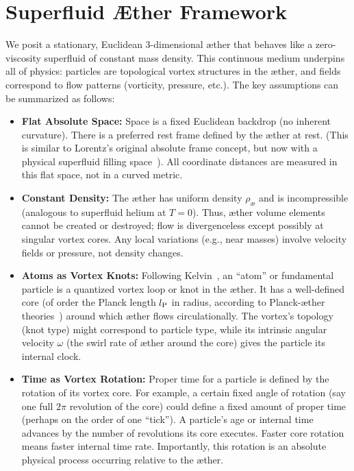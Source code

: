 
\section{Superfluid Æther Framework}

We posit a stationary, Euclidean 3-dimensional æther that behaves like a zero-viscosity superfluid of constant mass density. This continuous medium underpins all of physics: particles are topological vortex structures in the æther, and fields correspond to flow patterns (vorticity, pressure, etc.). The key assumptions can be summarized as follows:

\begin{itemize}
    \item \textbf{Flat Absolute Space:} Space is a fixed Euclidean backdrop (no inherent curvature). There is a preferred rest frame defined by the æther at rest. (This is similar to Lorentz’s original absolute frame concept, but now with a physical superfluid filling space~\cite{Winterberg2002-PlanckAether}). All coordinate distances are measured in this flat space, not in a curved metric.

    \item \textbf{Constant Density:} The æther has uniform density $\rho_{\text{\ae}}$ and is incompressible (analogous to superfluid helium at $T=0$). Thus, æther volume elements cannot be created or destroyed; flow is divergenceless except possibly at singular vortex cores. Any local variations (e.g., near masses) involve velocity fields or pressure, not density changes.

    \item \textbf{Atoms as Vortex Knots:} Following Kelvin~\cite{Kelvin1867-vortex}, an “atom” or fundamental particle is a quantized vortex loop or knot in the æther. It has a well-defined core (of order the Planck length $l_{\rm P}$ in radius, according to Planck-æther theories~\cite{Winterberg2002-PlanckAether}) around which æther flows circulationally. The vortex’s topology (knot type) might correspond to particle type, while its intrinsic angular velocity $\omega$ (the swirl rate of æther around the core) gives the particle its internal clock.

    \item \textbf{Time as Vortex Rotation:} Proper time for a particle is defined by the rotation of its vortex core. For example, a certain fixed angle of rotation (say one full $2\pi$ revolution of the core) could define a fixed amount of proper time (perhaps on the order of one “tick”). A particle’s age or internal time advances by the number of revolutions its core executes. Faster core rotation means faster internal time rate. Importantly, this rotation is an absolute physical process occurring relative to the æther.


\end{itemize}
